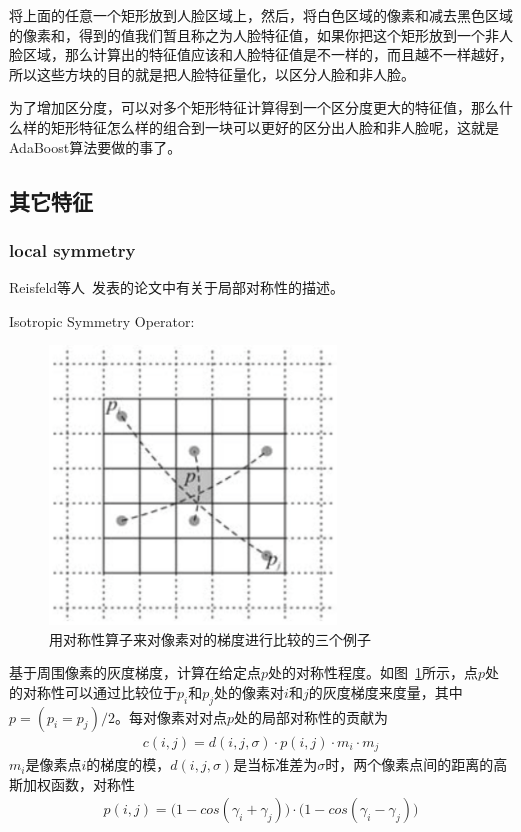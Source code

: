 \documentclass[12pt]{article}
\begin{document}
将上面的任意一个矩形放到人脸区域上，然后，将白色区域的像素和减去黑色区域的像素和，得到的值我们暂且称之为人脸特征值，如果你把这个矩形放到一个非人脸区域，那么计算出的特征值应该和人脸特征值是不一样的，而且越不一样越好，所以这些方块的目的就是把人脸特征量化，以区分人脸和非人脸。

为了增加区分度，可以对多个矩形特征计算得到一个区分度更大的特征值，那么什么样的矩形特征怎么样的组合到一块可以更好的区分出人脸和非人脸呢，这就是AdaBoost算法要做的事了。

\subsection{其它特征}

\subsubsection{local symmetry}

Reisfeld等人~\cite{reisfeld1995context}发表的论文中有关于局部对称性的描述。

Isotropic Symmetry Operator:

\begin{figure}[!ht]
 \centering
 \includegraphics[width=3in]{ExamplesofPixelpairs}
\caption{用对称性算子来对像素对的梯度进行比较的三个例子}
\label{fig: ExamplesofPixelpairs}
\end{figure}

基于周围像素的灰度梯度，计算在给定点$p$处的对称性程度。如图~\ref{fig: ExamplesofPixelpairs}所示，点$p$处的对称性可以通过比较位于$p_i$和$p_j$处的像素对$i$和$j$的灰度梯度来度量，其中$p = (p_i  = p_j)/2$。每对像素对对点$p$处的局部对称性的贡献为
\begin{align}
c(i, j) = d(i, j, \sigma) \cdot p(i, j) \cdot m_i \cdot m_j
\end{align}
$m_i$是像素点$i$的梯度的模，$d(i, j, \sigma)$是当标准差为$\sigma$时，两个像素点间的距离的高斯加权函数，对称性
\begin{align}
p(i, j) = \Big(1-cos(\gamma_i+\gamma_j)\Big)\cdot \Big(1-cos(\gamma_i-\gamma_j)\Big)
\label{eq: SymmetryMeasurement}
\end{align}
\end{document}
